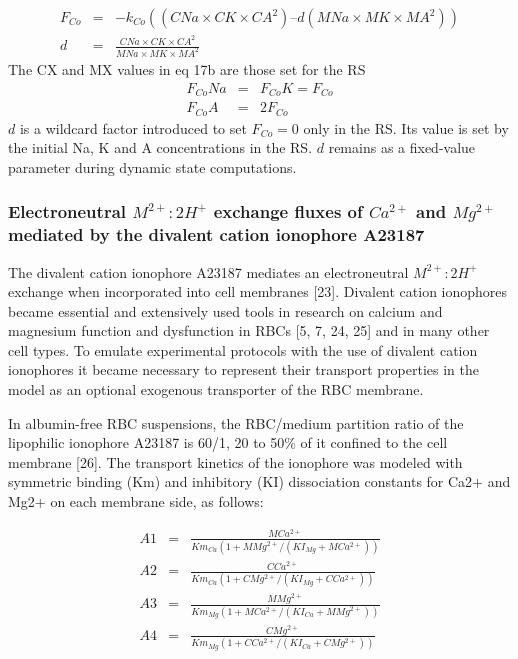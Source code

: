 \documentclass[a4paper]{article}
\newcommand{\med}[1]{M#1}
\newcommand{\cell}[1]{C#1}
\newcommand{\MA}{\med{A}}
\newcommand{\MNa}{\med{Na}}
\newcommand{\MK}{\med{K}}
\newcommand{\MCatp}{\med{Ca^{2+}}}
\newcommand{\MMgtp}{\med{Mg^{2+}}}
\newcommand{\Km}[1]{Km_{#1}}
\newcommand{\KI}[1]{KI_{#1}}
\newcommand{\CNa}{\cell{Na}}
\newcommand{\CK}{\cell{K}}
\newcommand{\CMgtp}{\cell{Mg^{2+}}}
\newcommand{\CCatp}{\cell{Ca^{2+}}}
\newcommand{\CA}{\cell{A}}
\newcommand{\F}[2]{F_{#1}#2}
\newcommand{\kk}[2]{k_{#1}#2}
\begin{document}
\begin{eqnarray}
\F{Co}{} &=& -\kk{Co}{}((CNa\times\CK\times\CA^2) – d(MNa\times\MK\times\MA^2)) \\
d &=& \frac{\CNa\times\CK\times\CA^2}{\MNa\times\MK\times\MA^2}
\end{eqnarray}
The CX and MX values in eq 17b are those set for the RS 
\begin{eqnarray}
\F{Co}{Na} &=& \F{Co}{K} = \F{Co}{}\\
\F{Co}{A} &=& 2\F{Co}{}
\end{eqnarray}
$d$ is a wildcard factor introduced to set $\F{Co}{} = 0$ only in the RS. Its value is set by the initial Na, K and A concentrations in the RS. $d$ remains as a fixed-value parameter during dynamic state computations.    

\subsubsection{Electroneutral $M^{2+}:2H^+$ exchange fluxes of $Ca^{2+}$ and $Mg^{2+}$ mediated by the divalent cation ionophore A23187}

The divalent cation ionophore A23187 mediates an electroneutral $M^{2+}:2H^+$ exchange when incorporated into cell membranes [23]. Divalent cation ionophores became essential and extensively used tools in research on calcium and magnesium function and dysfunction in RBCs [5, 7, 24, 25] and in many other cell types. To emulate experimental protocols with the use of divalent cation ionophores it became necessary to represent their transport properties in the model as an optional exogenous transporter of the RBC membrane.  

In albumin-free RBC suspensions, the RBC/medium partition ratio of the lipophilic ionophore A23187 is 60/1, 20 to 50\% of it confined to the cell membrane [26].  The transport kinetics of the ionophore was modeled with symmetric binding (Km) and inhibitory (KI) dissociation constants for Ca2+ and Mg2+ on each membrane side, as follows:


\begin{eqnarray}
\nonumber A1 &=& \frac{\MCatp}{\Km{Ca}(1 + \MMgtp/(\KI{Mg} + \MCatp))} \\
\nonumber A2 &=& \frac{\CCatp}{\Km{Ca}(1 + \CMgtp/(\KI{Mg} + \CCatp))}  \\
\nonumber A3 &=& \frac{\MMgtp}{\Km{Mg}(1 + \MCatp/(\KI{Ca} + \MMgtp))}  \\
\nonumber A4 &=& \frac{\CMgtp}{\Km{Mg}(1 + \CCatp/(\KI{Ca} + \CMgtp))} 
\end{eqnarray}
\end{document}
